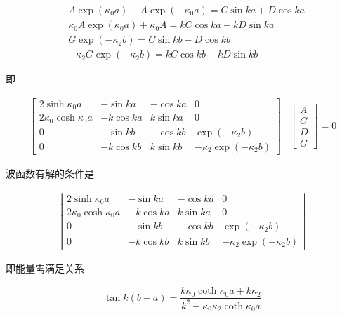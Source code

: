 \documentclass{article}
\begin{document}
\begin{equation*}
  \begin{aligned}
    & A \exp \left( \kappa_0 a \right) - A \exp \left( - \kappa_0 a \right) = C \sin ka + D \cos ka \\
    & \kappa_0 A \exp \left( \kappa_0 a \right) + \kappa_0 A = kC \cos ka - kD \sin ka \\
    & G \exp \left(  - \kappa_2 b \right) = C \sin kb - D \cos kb \\
    & - \kappa_2 G \exp \left( - \kappa_2 b \right) = k C \cos kb - kD \sin kb
  \end{aligned}
\end{equation*}

即

\begin{equation*}
  \begin{aligned}
    \left[
      \begin{array}{cccc}
       2\sinh \kappa_0 a & -\sin ka & -\cos ka & 0 \\
       2\kappa_0 \cosh \kappa_0 a & - k \cos ka & k\sin ka & 0 \\
       0 & - \sin kb & -\cos kb & \exp \left( - \kappa_2 b \right) \\
       0 & - k \cos kb & k \sin kb & - \kappa_2 \exp \left( - \kappa_2 b \right)
      \end{array}
    \right ]
  \end{aligned}
  \begin{aligned}
    \left[
      \begin{array}{c}
       A \\
       C \\
       D \\
       G 
      \end{array}
    \right ]
    =0 
  \end{aligned}
\end{equation*}

波函数有解的条件是

\begin{equation*}
  \begin{aligned}
    \left|
      \begin{array}{cccc}
       2\sinh \kappa_0 a & -\sin ka & -\cos ka & 0 \\
       2\kappa_0 \cosh \kappa_0 a & - k \cos ka & k\sin ka & 0 \\
       0 & - \sin kb & -\cos kb & \exp \left( - \kappa_2 b \right) \\
       0 & - k \cos kb & k \sin kb & - \kappa_2 \exp \left( - \kappa_2 b \right)
      \end{array}
    \right|
  \end{aligned}
\end{equation*}

即能量需满足关系

\begin{equation*}
  \begin{aligned}
    \tan k \left( b - a \right) = \dfrac{k \kappa_0 \coth \kappa_0 a + k \kappa_2}{k^2 - \kappa_0 \kappa_2 \coth \kappa_0 a} 
  \end{aligned}
\end{equation*}


\end{document}
